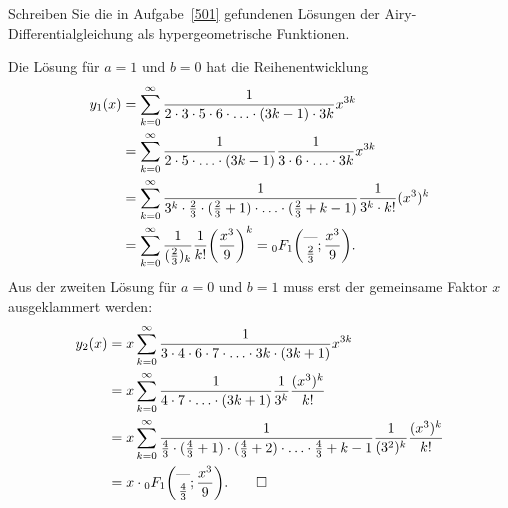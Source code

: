 Schreiben Sie die in Aufgabe~\ref{501} gefundenen Lösungen der
Airy-Differentialgleichung als hypergeometrische Funktionen.
%

\begin{loesung}
Die Lösung für $a=1$ und $b=0$ hat die Reihenentwicklung
\begin{align*}
y_1(x)
&=
\sum_{k=0}^\infty
\frac{1}{2\cdot 3\cdot 5\cdot 6\cdot\ldots\cdot (3k-1)\cdot 3k}
x^{3k}
\\
&=
\sum_{k=0}^\infty
\frac{1}{2\cdot 5\cdot \ldots\cdot (3k-1)}
\frac{1}{3\cdot 6\cdot \ldots\cdot 3k}
x^{3k}
\\
&=
\sum_{k=0}^\infty
\frac{1}{3^k\cdot \frac23\cdot(\frac23+1)\cdot\ldots\cdot(\frac23+k-1)}
\frac{1}{3^k\cdot k!}
(x^3)^k
\\
&=
\sum_{k=0}^\infty
\frac{1}{(\frac23)_k} \frac{1}{k!}\biggl(\frac{x^3}{9}\biggr)^k
=
\mathstrut_0F_1\biggl(
\begin{matrix}\text{---}\\\frac23\end{matrix};\frac{x^3}{9}
\biggr).
\end{align*}
Aus der zweiten Lösung für $a=0$ und $b=1$ muss erst der gemeinsame
Faktor $x$ ausgeklammert werden:
\begin{align*}
y_2(x)
&=
x\sum_{k=0}^\infty
\frac{1}{3\cdot4\cdot 6\cdot 7\cdot\ldots\cdot 3k\cdot(3k+1)}x^{3k}
\\
&=
x\sum_{k=0}^\infty
\frac{1}{4\cdot 7\cdot\ldots\cdot (3k+1)}
\frac{1}{3^k}
\frac{(x^3)^k}{k!}
\\
&=
x\sum_{k=0}^\infty
\frac{1}{\frac43\cdot (\frac43+1)\cdot (\frac43+2)\cdot\ldots\cdot \frac43+k-1}
\frac{1}{(3^2)^k}
\frac{(x^3)^k}{k!}
\\
&=
x\cdot\mathstrut_0F_1\biggl(
\begin{matrix}\text{---}\\\frac43\end{matrix};
\frac{x^3}{9}
\biggr).
\qedhere
\end{align*}
\end{loesung}
